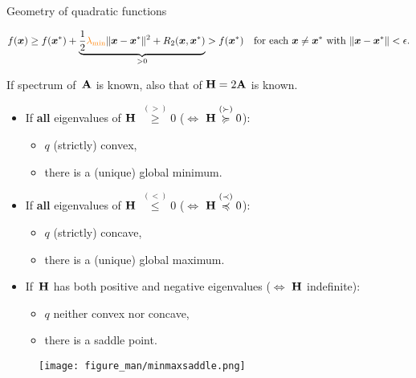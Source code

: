 \documentclass[11pt,compress,t,notes=noshow, xcolor=table]{beamer}
\begin{document}
\begin{vbframe}{Geometry of quadratic functions}
    \vspace{-1.25\baselineskip}

    \begin{equation*}
        f(\bm{x}) \geq f(\bm{x}^\ast) + \underbrace{\frac{1}{2} \textcolor{orange}{\lambda_\text{min}} \|\bm{x}-\bm{x}^\ast\|^2 + R_2(\bm{x},\bm{x}^\ast)}_{>0} > f(\bm{x}^\ast) \quad\text{for each $\bm{x} \neq \bm{x}^\ast$ with $\|\bm{x}-\bm{x}^\ast\|<\epsilon$}.
    \end{equation*}


\framebreak

If spectrum of~$\mathbf{A}$ is known, also that of $\mathbf{H} = 2\mathbf{A}$ is known.

\begin{itemize}
    \item If \textbf{all} eigenvalues of $\mathbf{H}$ $\overset{(>)}{\geq} 0$ ($\Leftrightarrow$ $\mathbf{H} \overset{(\succ)}{\succcurlyeq} 0$):
        \begin{itemize} 
            \item $q$ (strictly) convex,
            \item there is a (unique) global minimum. 
        \end{itemize}
    \item If \textbf{all} eigenvalues of $\mathbf{H}$ $\overset{(<)}{\leq} 0$ ($\Leftrightarrow$ $\mathbf{H} \overset{(\prec)}{\preccurlyeq} 0$):
        \begin{itemize} 
            \item $q$ (strictly) concave,
            \item there is a (unique) global maximum. 
        \end{itemize}
    \item If~$\mathbf{H}$ has both positive and negative eigenvalues ($\Leftrightarrow$ $\mathbf{H}$ indefinite):
        \begin{itemize}
            \item $q$ neither convex nor concave,
            \item there is a saddle point.
        \end{itemize}
\end{itemize}


\begin{figure}
    \centering
    \texttt{[image: figure\_man/minmaxsaddle.png]}
\end{figure}

\end{vbframe}
\end{document}
